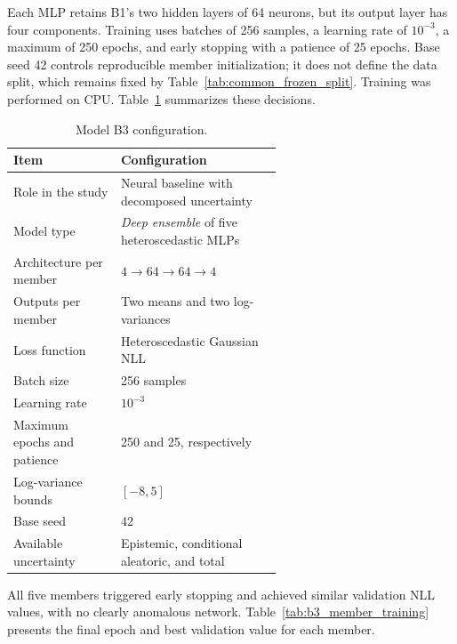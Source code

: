 \documentclass[12pt,a4paper]{report}
\begin{document}
Each MLP retains B1's two hidden layers of 64 neurons, but its output layer has four components. Training uses batches of 256 samples, a learning rate of $10^{-3}$, a maximum of 250 epochs, and early stopping with a patience of 25 epochs. Base seed 42 controls reproducible member initialization; it does not define the data split, which remains fixed by Table~\ref{tab:common_frozen_split}. Training was performed on CPU. Table~\ref{tab:b3_configuration} summarizes these decisions.

\begin{table}[htbp]
    \centering
    \caption{Model B3 configuration.}
    \label{tab:b3_configuration}
    \begin{tabular}{@{}lp{0.60\linewidth}@{}}
        \toprule
        Item & Configuration \\
        \midrule
        Role in the study
            & Neural baseline with decomposed uncertainty \\
        Model type
            & \textit{Deep ensemble} of five heteroscedastic MLPs \\
        Architecture per member
            & $4 \rightarrow 64 \rightarrow 64 \rightarrow 4$ \\
        Outputs per member
            & Two means and two log-variances \\
        Loss function
            & Heteroscedastic Gaussian NLL \\
        Batch size
            & 256 samples \\
        Learning rate
            & $10^{-3}$ \\
        Maximum epochs and patience
            & 250 and 25, respectively \\
        Log-variance bounds
            & $[-8,5]$ \\
        Base seed
            & 42 \\
        Available uncertainty
            & Epistemic, conditional aleatoric, and total \\
        \bottomrule
    \end{tabular}
\end{table}

All five members triggered early stopping and achieved similar validation NLL values, with no clearly anomalous network. Table~\ref{tab:b3_member_training} presents the final epoch and best validation value for each member.
\end{document}
